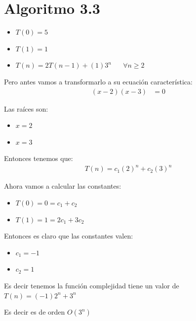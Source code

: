 \documentclass[12pt, fleqn]{article}                            %
\DeclareMathOperator \Space {\quad}                             %
\theoremstyle{break}                                            %
\begin{document}
    \clearpage
    \section{Algoritmo 3.3}

        \begin{itemize}
            \item $T(0) = 5$
            \item $T(1) = 1$
            \item $T(n) = 2T(n - 1) + (1)3^n \Space \forall n \geq 2$
        \end{itemize}

        Pero antes vamos a transformarlo a su ecuación característica:
        \begin{align*}
            (x - 2)(x - 3) &= 0
        \end{align*}

        Las raíces son:
        \begin{itemize}
            \item $x = 2$
            \item $x = 3$
        \end{itemize}

        Entonces tenemos que:
        \begin{align*}
            T(n) = c_1(2)^n + c_2(3)^n
        \end{align*}

        Ahora vamos a calcular las constantes:
        \begin{itemize}
            \item $T(0) = 0 = c_1 + c_2$
            \item $T(1) = 1 = 2c_1 + 3c_2$
        \end{itemize}

        Entonces es claro que las constantes valen:
        \begin{itemize}
            \item $c_1 = -1$
            \item $c_2 = 1$
        \end{itemize}

        Es decir tenemos la función complejidad tiene un valor de
        $T(n) = (-1)2^n + 3^n$

        Es decir es de orden $O(3^n)$
\end{document}
